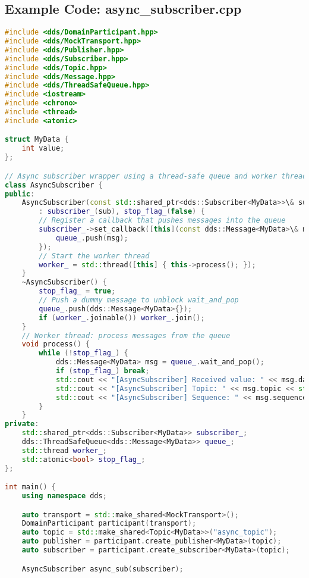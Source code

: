 \documentclass[12pt]{report}
\begin{document}
\subsection{Example Code: async\_subscriber.cpp}
\begin{lstlisting}[language=C++]
#include <dds/DomainParticipant.hpp>
#include <dds/MockTransport.hpp>
#include <dds/Publisher.hpp>
#include <dds/Subscriber.hpp>
#include <dds/Topic.hpp>
#include <dds/Message.hpp>
#include <dds/ThreadSafeQueue.hpp>
#include <iostream>
#include <chrono>
#include <thread>
#include <atomic>

struct MyData {
    int value;
};

// Async subscriber wrapper using a thread-safe queue and worker thread
class AsyncSubscriber {
public:
    AsyncSubscriber(const std::shared_ptr<dds::Subscriber<MyData>>\& sub)
        : subscriber_(sub), stop_flag_(false) {
        // Register a callback that pushes messages into the queue
        subscriber_->set_callback([this](const dds::Message<MyData>\& msg) {
            queue_.push(msg);
        });
        // Start the worker thread
        worker_ = std::thread([this] { this->process(); });
    }
    ~AsyncSubscriber() {
        stop_flag_ = true;
        // Push a dummy message to unblock wait_and_pop
        queue_.push(dds::Message<MyData>{});
        if (worker_.joinable()) worker_.join();
    }
    // Worker thread: process messages from the queue
    void process() {
        while (!stop_flag_) {
            dds::Message<MyData> msg = queue_.wait_and_pop();
            if (stop_flag_) break;
            std::cout << "[AsyncSubscriber] Received value: " << msg.data.value << std::endl;
            std::cout << "[AsyncSubscriber] Topic: " << msg.topic << std::endl;
            std::cout << "[AsyncSubscriber] Sequence: " << msg.sequence_number << std::endl;
        }
    }
private:
    std::shared_ptr<dds::Subscriber<MyData>> subscriber_;
    dds::ThreadSafeQueue<dds::Message<MyData>> queue_;
    std::thread worker_;
    std::atomic<bool> stop_flag_;
};

int main() {
    using namespace dds;

    auto transport = std::make_shared<MockTransport>();
    DomainParticipant participant(transport);
    auto topic = std::make_shared<Topic<MyData>>("async_topic");
    auto publisher = participant.create_publisher<MyData>(topic);
    auto subscriber = participant.create_subscriber<MyData>(topic);

    AsyncSubscriber async_sub(subscriber);


\end{lstlisting}
\end{document}
